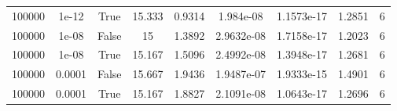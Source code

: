 \begin{table}
\begin{tabular}{ccccccccc}
100000 & 1e-12 & True & 15.333 & 0.9314 & 1.984e-08 & 1.1573e-17 & 1.2851 & 6 \\
100000 & 1e-08 & False & 15 & 1.3892 & 2.9632e-08 & 1.7158e-17 & 1.2023 & 6 \\
100000 & 1e-08 & True & 15.167 & 1.5096 & 2.4992e-08 & 1.3948e-17 & 1.2681 & 6 \\
100000 & 0.0001 & False & 15.667 & 1.9436 & 1.9487e-07 & 1.9333e-15 & 1.4901 & 6 \\
100000 & 0.0001 & True & 15.167 & 1.8827 & 2.1091e-08 & 1.0643e-17 & 1.2696 & 6 \\
\bottomrule
\end{tabular}
\end{table}
